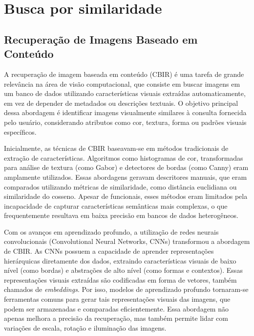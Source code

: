 \chapter{Busca por similaridade}
\label{cap:req}



\begin{overview}
  \lipsum[1]
\end{overview}



\section{Recuperação de Imagens Baseado em Conteúdo}
\label{sec:cbir}

A recuperação de imagem baseada em conteúdo (CBIR) é uma tarefa de grande relevância na área de visão computacional, que consiste em buscar imagens em um banco de dados utilizando características visuais extraídas automaticamente, em vez de depender de metadados ou descrições textuais. O objetivo principal dessa abordagem é identificar imagens visualmente similares à consulta fornecida pelo usuário, considerando atributos como cor, textura, forma ou padrões visuais específicos.

Inicialmente, as técnicas de CBIR baseavam-se em métodos tradicionais de extração de características. Algoritmos como histogramas de cor, transformadas para análise de textura (como Gabor) e detectores de bordas (como Canny) eram amplamente utilizados. Essas abordagens geravam descritores manuais, que eram comparados utilizando métricas de similaridade, como distância euclidiana ou similaridade do cosseno. Apesar de funcionais, esses métodos eram limitados pela incapacidade de capturar características semânticas mais complexas, o que frequentemente resultava em baixa precisão em bancos de dados heterogêneos.

Com os avanços em aprendizado profundo, a utilização de redes neurais convolucionais (Convolutional Neural Networks, CNNs) transformou a abordagem de CBIR. As CNNs possuem a capacidade de aprender representações hierárquicas diretamente dos dados, extraindo características visuais de baixo nível (como bordas) e abstrações de alto nível (como formas e contextos). Essas representações visuais extraídas são codificadas em forma de vetores, também chamados de \emph{embeddings}. Por isso, modelos de aprendizado profundo tornaram-se ferramentas comuns para gerar tais representações visuais das imagens, que podem ser armazenadas e comparadas eficientemente. Essa abordagem não apenas melhora a precisão da recuperação, mas também permite lidar com variações de escala, rotação e iluminação das imagens.

